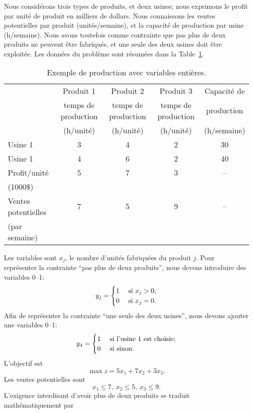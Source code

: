\begin{example}
Nous considérons trois types de produits, et deux usines; nous exprimons le profit par unité de produit en milliers de dollars.
Nous connaissons les ventes potentielles par produit (unités/semaine), et la capacité de production par usine (h/semaine).
Nous avons toutefois comme contrainte que pas plus de deux produits ne peuvent être fabriqués, et une seule des deux usines doit être exploitée.
Les données du problème sont résumées dans la Table~\ref{tab:prod_integer}.
\begin{table}[htb]
\begin{center}
\begin{tabular}{|l|c|c|c|c|}
\hline
& Produit 1 & Produit 2 & Produit 3 & Capacité de \\
& temps de production & temps de production & temps de production & production \\
& (h/unité) &(h/unité) &(h/unité) & (h/semaine) \\
\hline
Usine 1 & 3 & 4 & 2 & 30 \\
\hline
Usine 1 & 4 & 6 & 2 & 40 \\
\hline
Profit/unité& 5 & 7 & 3 & --\\
(1000\$) & & & & \\
\hline
Ventes potentielles & 7 & 5 & 9 & --\\
 (par semaine) & & & & \\
 \hline
\end{tabular}
\caption{Exemple de production avec variables entières.}
\label{tab:prod_integer}
\end{center}
\end{table}
Les variables sont $x_j$, le nombre d'unités fabriquées du produit $j$.
Pour représenter la contrainte ``pas plus de deux produits'', nous devons introduire des variables 0--1:
\[
y_j =
\begin{cases}
1 & \mbox{ si } x_j > 0; \\
0 & \mbox{ si } x_j = 0.
\end{cases}
\]
Afin de représenter la contrainte ``une seule des deux usines'', nous devons ajouter une variables 0--1:
\[
y_4 =
\begin{cases}
1 & \mbox{ si } \mbox{l'usine 1 est choisie}; \\
0 & \mbox{ si } \mbox{sinon}.
\end{cases}
\]
L'objectif est
\[
\max z = 5x_1 + 7x_2 + 3x_3.
\]
Les ventes potentielles sont
\[
x_1 \leq 7,\ x_2 \leq 5,\ x_3 \leq 9.
\]
L'exigence interdisant d'avoir plus de deux produits se traduit mathématiquement par

\end{example}
